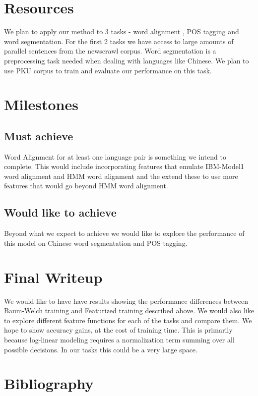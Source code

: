 \documentclass[11pt]{article}
\begin{document}
\section{Resources}
We plan to apply our method to 3 tasks - word alignment , POS tagging and word segmentation. For the first 2 tasks we have access to large amounts of parallel sentences from the newscrawl corpus. Word segmentation is a preprocessing task needed when dealing with languages like Chinese. We plan to use PKU corpus to train and evaluate our performance on this task.

\section{Milestones}
\subsection{Must achieve}
Word Alignment for at least one language pair is something we intend to complete. This would include incorporating features that emulate IBM-Model1 word alignment and HMM word alignment \cite{1992 hmm paper} and the extend these to use more features that would go beyond HMM word alignment.
\subsection{Would like to achieve}
Beyond what we expect to achieve we would like to explore the performance of this model on Chinese word segmentation and POS tagging.


\section{Final Writeup}
We would like to have have results showing the performance differences between Baum-Welch training and Featurized training described above. We would also like to explore different feature functions for each of the tasks and compare them. We hope to show accuracy gains, at the cost of training time. This is primarily because log-linear modeling requires a normalization term summing over all possible decisions. In our tasks this could be a very large space. 

\section{Bibliography}
\end{document}
